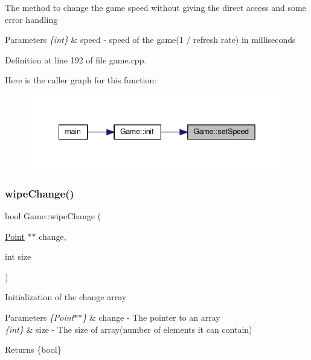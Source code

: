 The method to change the game speed without giving the direct access and some error handling 
\begin{DoxyParams}{Parameters}
{\em \{int\}} & speed -\/ speed of the game(1 / refresh rate) in milliseconds \\
\hline
\end{DoxyParams}


Definition at line 192 of file game.\+cpp.

Here is the caller graph for this function\+:
\nopagebreak
\begin{figure}[H]
\begin{center}
\leavevmode
\includegraphics[width=342pt]{class_game_a5f3fdd22fa8ae39d6912ee3ff029ea46_icgraph}
\end{center}
\end{figure}
\mbox{\label{class_game_aa73688f1ba069a3f1989884099c58449}} 
\subsubsection{\texorpdfstring{wipeChange()}{wipeChange()}}
{\footnotesize\ttfamily bool Game\+::wipe\+Change (\begin{DoxyParamCaption}\item[{\mbox{\hyperlink{common_8h_aa9cfdb80b4ca12013a2de8a3b9b97981}{Point}} $\ast$$\ast$}]{change,  }\item[{int}]{size }\end{DoxyParamCaption})\hspace{0.3cm}{\ttfamily [private]}}

Initialization of the change array 
\begin{DoxyParams}{Parameters}
{\em \{\+Point$\ast$$\ast$\}} & change -\/ The pointer to an array \\
\hline
{\em \{int\}} & size -\/ The size of array(number of elements it can contain) \\
\hline
\end{DoxyParams}
\begin{DoxyReturn}{Returns}
\{bool\} 
\end{DoxyReturn}


